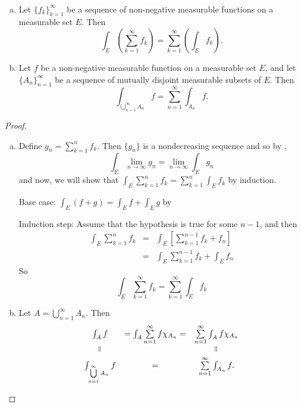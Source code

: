 \begin{pblm}\label{p:veryuseful}%
~
	\begin{enumerate}[(a)]
	\item Let $\{f_k\}_{k=1}^\infty$ be a sequence of non-negative measurable functions on a 
	measurable set $E$. Then 
	\begin{equation*}
		\int_E\left(\sum\limits_{k=1}^\infty f_k\right) = 
		\sum\limits_{k=1}^\infty\left(\int_Ef_k\right).
	\end{equation*}
	\item Let $f$ be a non-negative measurable function on a measurable set $E$, and let 
	$\{A_n\}_{n=1}^\infty$ be a sequence of mutually disjoint measurable subsets of $E$. 
	Then 
	\begin{equation*}
		\int_{\bigcup\limits_{n=1}^\infty A_n}f = \sum\limits_{n=1}^\infty\int_{A_n}f.
	\end{equation*}
	\end{enumerate}
\begin{proof}~
	\begin{enumerate}[(a)]
	\item Define $g_n = \sum\limits_{k=1}^nf_k$. Then $\{g_n\}$ is a nondecreasing 
		sequence and so by , 
		\begin{equation*}
			\int_E\lim\limits_{n\to\infty}g_n = \lim\limits_{n\to\infty}\int_Eg_n
		\end{equation*}
		and now, we will show that $\int_E\sum\limits_{k=1}^nf_k = \sum\limits_{k=1}^n\int_Ef_k$ 
		by induction. 

		\noindent Base case: $\int_E (f + g) = \int_Ef + \int_Eg$ by 

		\noindent Induction step: Assume that the hypothesis is true for some $n-1$, and then 
		\begin{equation*}
		\begin{array}{rcl}
			\int_E\sum\limits_{k=1}^nf_k &=& \int_E\left[\sum\limits_{k=1}^{n-1}f_k + f_n\right] \\
						&=& \int_E\sum\limits_{k=1}^{n-1}f_k+\int_Ef_n
		\end{array}
		\end{equation*}
		So 
		\begin{equation*}
			\int_E\sum\limits_{k=1}^\infty f_k = \sum\limits_{k=1}^\infty\int_Ef_k
		\end{equation*}
	\item Let $A = \bigcup\limits_{n=1}^\infty A_n$. Then 
		\begin{equation*}
		\begin{array}{ccc}
			\int_Af & = \int_A\sum\limits_{n=1}^\infty f\chi_{A_n} = & \sum\limits_{n=1}^\infty\int_Af\chi_{A_n}\\
			\verteq & & \verteq \\
			\int_{\bigcup\limits_{n=1}^\infty A_n}f & = & \sum\limits_{n=1}^\infty\int_{A_n}f.
		\end{array}
		\end{equation*}
	\end{enumerate}
\end{proof}
\end{pblm}

